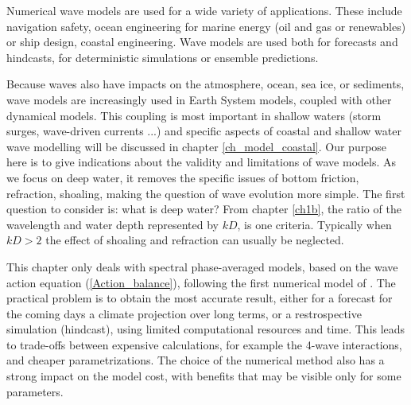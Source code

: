 Numerical wave models are used for a wide variety of applications. These include 
navigation safety, ocean engineering for marine energy (oil and gas or renewables) or ship design, coastal engineering. 
Wave models are used both for forecasts and hindcasts, for deterministic simulations or ensemble predictions. 

Because waves also have impacts on 
the atmosphere, ocean, sea ice, or sediments, wave models are increasingly used in Earth System models, coupled with other dynamical models. 
This coupling is most important in shallow waters (storm surges, wave-driven currents ...) and specific 
aspects of coastal and shallow water wave modelling will be discussed in chapter \ref{ch_model_coastal}. Our purpose here is to give indications about the 
validity and limitations of wave models. As we focus on deep water, it removes the specific issues of bottom friction, refraction, shoaling, 
making the question of wave evolution more simple. The first question to consider is: what is deep water?  From chapter \ref{ch1b}, the 
ratio of the wavelength and water depth represented by $kD$, is one criteria. Typically when $kD > 2$ the effect of shoaling and refraction can 
usually be neglected. 

This chapter only deals with spectral phase-averaged models, based on the wave action equation (\ref{Action_balance}), 
following the first numerical model of \cite{Gelci&al.1957}.  The practical problem is to obtain the most accurate result, either for 
a forecast for the coming days a climate projection over long terms, or a restrospective simulation (hindcast), using limited 
computational resources and time. This leads to trade-offs between expensive calculations, for example the 4-wave interactions, 
and cheaper parametrizations. The choice of the numerical method also has a strong impact on the model cost, with benefits that may be visible 
only for some parameters. 

